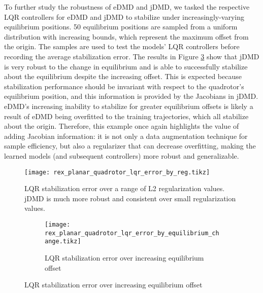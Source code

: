 \documentclass{article}
\begin{document}
      To further study the robustness of eDMD and jDMD, we tasked the respective LQR controllers for eDMD and jDMD to stabilize under increasingly-varying equilibrium positions. 50 equilibrium positions are sampled from a uniform distribution with increasing bounds, which represent the maximum offset from the origin. The samples are used to test the models' LQR controllers before recording the average stabilization error. The results in Figure \ref{fig:rex_planar_quadrotor_lqr_error_by_equilibrium_change} show that jDMD is very robust to the change in equilibrium and is able to successfully stabilize about the equilibrium despite the increasing offset. This is expected because stabilization performance should be invariant with respect to the quadrotor's equilibrium position, and this information is provided by the Jacobians in jDMD. eDMD's increasing inability to stabilize for greater equilibrium offsets is likely a result of eDMD being overfitted to the training trajectories, which all stabilize about the origin. Therefore, this example once again highlights the value of adding Jacobian information: it is not only a data augmentation technique for sample efficiency, but also a regularizer that can decrease overfitting, making the learned models (and subsequent controllers) more robust and generalizable.
      
      \begin{figure}
        \centering
        \texttt{[image: rex\_planar\_quadrotor\_lqr\_error\_by\_reg.tikz]}
        \caption{LQR stabilization with equilibrium offset}
        \label{fig:rex_planar_quadrotor_lqr_error_by_reg}
        \caption{ LQR stabilization error over a range of L2 regularization values. jDMD is much more robust and consistent over small regularization values.}
      \end{figure}
      
      \begin{figure}
        \centering
        \begin{subfigure}[t]{0.45\textwidth}
          \texttt{[image: rex\_planar\_quadrotor\_lqr\_error\_by\_equilibrium\_change.tikz]}
          \caption{LQR stabilization error over increasing equilibrium offset}
          \label{fig:rex_planar_quadrotor_lqr_error_by_equilibrium_change}
        \end{subfigure}
      \end{figure}
      
\end{document}
